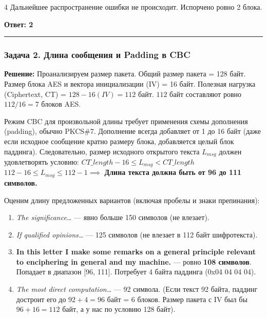 ﻿\documentclass[8pt,a4paper,landscape]{extarticle}
\newcommand{\tightlist}{}
\begin{document}
\begin{multicols*}{4}
Дальнейшее распространение ошибки не происходит. Испорчено ровно 2 блока.

\textbf{Ответ: 2}

\begin{center}\rule{0.5\linewidth}{0.5pt}\end{center}

\subsubsection{Задача 2. Длина сообщения и Padding в CBC}\label{ux437ux430ux434ux430ux447ux430-2.-ux434ux43bux438ux43dux430-ux441ux43eux43eux431ux449ux435ux43dux438ux44f-ux438-padding-ux432-cbc}

\textbf{Решение:} Проанализируем размер пакета. Общий размер пакета = 128 байт. Размер блока AES и вектора инициализации (IV) = 16 байт. Полезная нагрузка (Ciphertext, CT) = \(128 - 16 (IV) = 112\) байт. \(112\) байт составляют ровно \(112 / 16 = 7\) блоков AES.

Режим CBC для произвольной длины требует применения схемы дополнения (padding), обычно PKCS\#7. Дополнение всегда добавляет от 1 до 16 байт (даже если исходное сообщение кратно размеру блока, добавляется целый блок паддинга). Следовательно, размер исходного открытого текста \(L_{msg}\) должен удовлетворять условию: \(CT\_length - 16 \le L_{msg} < CT\_length\) \(112 - 16 \le L_{msg} \le 112 - 1 \implies\) \textbf{Длина текста должна быть от 96 до 111 символов.}

Оценим длину предложенных вариантов (включая пробелы и знаки препинания):

\begin{enumerate}
\def\labelenumi{\arabic{enumi}.}
\tightlist
\item
  \emph{The significance\ldots{}} --- явно больше 150 символов (не влезает).
\item
  \emph{If qualified opinions\ldots{}} --- 125 символов (не влезает в 112 байт шифротекста).
\item
  \textbf{In this letter I make some remarks on a general principle relevant to enciphering in general and my machine.} --- ровно \textbf{108 символов}. Попадает в диапазон {[}96, 111{]}. Потребует 4 байта паддинга (0x04 04 04 04).
\item
  \emph{The most direct computation\ldots{}} --- 92 символа. (Если текст 92 байта, паддинг достроит его до \(92+4 = 96\) байт = 6 блоков. Размер пакета с IV был бы \(96+16 = 112\) байт, а у нас по условию 128 байт).
\end{enumerate}


\end{multicols*}
\end{document}
